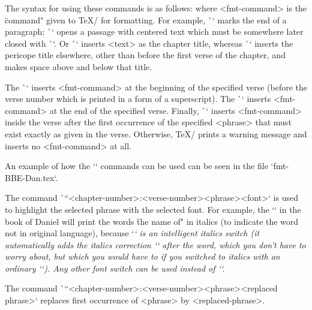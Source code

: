The syntax for using these commands is as follows:
\begtt
{}
\endtt
where <fmt-command> is the \"command" given to \TeX/ for formatting.
For example, \`\endgraf` marks the end of a paragraph; \`\begcenter` opens a passage with
centered text which must be somewhere later closed  with \`\endcenter`. Or 
\`` inserts <text> as the chapter title, whereas
\`` inserts the pericope title elsewhere, other than before the first verse of the chapter, and makes space above and below that title.

The \`\fmtpre`  inserts <fmt-command>
at the beginning of the specified verse (before the verse number which is printed in a form 
of a superscript). 
The \`\fmtadd`  inserts <fmt-command> at the end of the specified verse.
Finally, \`\fmtins` inserts <fmt-command> inside the verse after the first occurrence of the 
specified <phrase> that must exist exactly as given in the verse. Otherwise, \TeX/ prints a warning 
message and inserts no <fmt-command> at all.

An example of how the `\fmt*` commands can be used can be seen in the file
`fmt-BBE-Dan.tex`.

The command \`\fmtfont``{<chapter-number>:<verse-number>}{<phrase>}{<font>}`
is used to highlight the selected phrase with the selected font.
For example, the `` in the book of Daniel will print the words
\"the name of\thinspace "  in italics (to indicate the word not in original language), because `\em` is an    intelligent italics switch (it automatically adds the italics correction `\/` after the word, which you don't have to worry about, but which you would have to if you switched to italics with an ordinary `\it`).
Any other font switch can be used instead of `\em`.

The command \`\fmtrepl``{<chapter-number>:<verse-number>}{<phrase>}{<replaced phrase>}`
replaces first occurrence of <phrase> by <replaced-phrase>.

